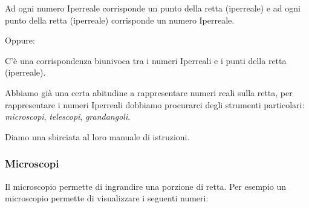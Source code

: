 \begin{postulato}
Ad ogni numero Iperreale corrisponde un punto della retta (iperreale) e ad 
ogni punto della retta (iperreale) corrisponde un numero Iperreale.
\end{postulato}

Oppure:

\begin{postulato}
C'è una corrispondenza biunivoca tra i numeri Iperreali e 
i punti della retta (iperreale).
\end{postulato}

Abbiamo già una certa abitudine a rappresentare numeri reali sulla retta, 
per rappresentare i numeri Iperreali dobbiamo procurarci degli strumenti 
particolari: \emph{microscopi}, \emph{telescopi}, \emph{grandangoli}.

Diamo una sbirciata al loro manuale di istruzioni.

\subsubsection{Microscopi}
\label{subsec:insnum_microscopio}

Il microscopio permette di ingrandire una porzione di retta. 
Per esempio un microscopio permette di visualizzare i seguenti numeri:

